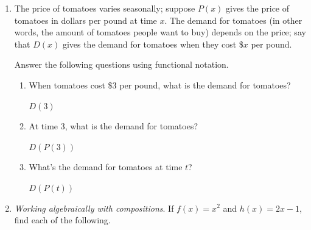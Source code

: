 \documentclass{article}
\begin{document}
\begin{enumerate}
\item 


  The price of tomatoes varies seasonally; suppose $P(x)$ gives the price of tomatoes in dollars per pound at time $x$. The demand for tomatoes (in other words, the amount of tomatoes people want to buy) depends on the price; say that $D(x)$ gives the demand for tomatoes when they cost \$$x$ per pound.

  Answer the following questions using functional notation. 

  \begin{enumerate}
  \item
    \begin{problem}[\vfill]
      When tomatoes cost \$3 per pound, what is the demand for tomatoes? 
    \end{problem}

    \begin{solution} 
      $D(3)$
    \end{solution}

  \item
    \begin{problem}[\vfill] 
      At time $3$, what is the demand for tomatoes? 
    \end{problem}

    \begin{solution} 
      $D(P(3))$
    \end{solution}

  \item
    \begin{problem}[\vfill]
      What's the demand for tomatoes at time $t$? 
    \end{problem}

    \begin{solution}
      $D(P(t))$
    \end{solution}

  \end{enumerate} 

\item 

  \emph{Working algebraically with compositions}. If $f(x) = x^2$ and $h(x) = 2x-1$, find each of the following.

  \begin{enumerate}


\end{enumerate}
\end{enumerate}
\end{document}
